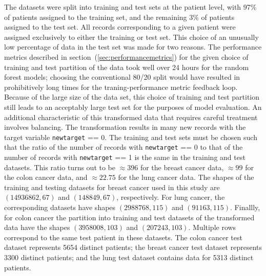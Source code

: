 \documentclass[10pt,letterpaper]{article}
\newcommand{\codewhite}[1]{\colorbox{white}{\texttt{#1}}}
\begin{document}
The datasets were split into training and test sets at the patient level, with 97\% of patients assigned to the training set, and the remaining 3\% of patients assigned to the test set.
All records corresponding to a given patient were assigned exclusively to either the training or test set.
This choice of an unusually low percentage of data in the test set was made for two reasons. The performance metrics described in section~(\ref{sec:performancemetrics}) for the given choice of training and test partition of the data took well over 24 hours for the random forest models; choosing the conventional 80/20 split would have resulted in prohibitively long times for the traning-performance metric feedback loop. Because of the large size of the data set, this choice of training and test partition still leads to an acceptably large test set for the purposes of model evaluation.
An additional characteristic of this transformed data that requires careful treatment involves balancing. The transformation results in many new records with the target variable \codewhite{newtarget} == 0. The training and test sets must be chosen such that the ratio of the number of records with \codewhite{newtarget} == 0 to that of the number of records with \codewhite{newtarget} == 1 is the same in the training and test datasets.
This ratio turns out to be $\approx 396$ for the breast cancer data, $\approx  99$ for the colon cancer data, and 
$\approx 22.75$ for the lung cancer data. 
The shapes of the training and testing datasets for breast cancer used in this study are $(14936862, 67)$ and 
$(148849, 67)$, respectively.
For lung cancer, the corresponding datasets have shapes $(2988768, 115)$ and $(91163, 115)$.
Finallly, for colon cancer the partition into training and test datasets of the transformed data have the shapes 
$(3958008, 103)$ and $(207243, 103)$. Multiple rows correspond to the same test patient in these datasets.
The colon cancer test dataset represents 5654 distinct patients; the breast cancer test dataset represents 3300 distinct patients; and the lung test dataset contains data for 5313 distinct patients.
\end{document}
